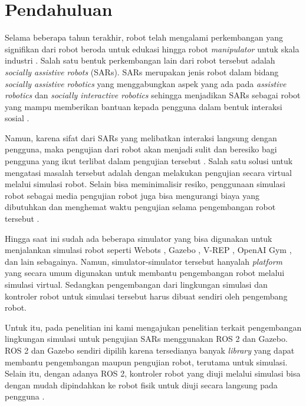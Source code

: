 \section{Pendahuluan}
\label{sec:pendahuluan}

Selama beberapa tahun terakhir, robot telah mengalami perkembangan yang signifikan dari robot beroda untuk edukasi \citep{goncalves2009} hingga robot \emph{manipulator} untuk skala industri \citep{Blatnicky2020}.
Salah satu bentuk perkembangan lain dari robot tersebut adalah \emph{socially assistive robots} (SARs).
SARs merupakan jenis robot dalam bidang \emph{socially assistive robotics} yang menggabungkan aspek yang ada pada \emph{assistive robotics} dan \emph{socially interactive robotics} sehingga menjadikan SARs sebagai robot yang mampu memberikan bantuan kepada pengguna dalam bentuk interaksi sosial \citep{seifer2005}.

Namun, karena sifat dari SARs yang melibatkan interaksi langsung dengan pengguna, maka pengujian dari robot akan menjadi sulit dan beresiko bagi pengguna yang ikut terlibat dalam pengujian tersebut \citep{erickson2020}.
Salah satu solusi untuk mengatasi masalah tersebut adalah dengan melakukan pengujian secara virtual melalui simulasi robot.
Selain bisa meminimalisir resiko, penggunaan simulasi robot sebagai media pengujian robot juga bisa mengurangi biaya yang dibutuhkan dan menghemat waktu pengujian selama pengembangan robot tersebut \citep{takaya2016}.

Hingga saat ini sudah ada beberapa simulator yang bisa digunakan untuk menjalankan simulasi robot seperti Webots \citep{michel2004}, Gazebo \citep{koenig2004}, V-REP \citep{rohmer2013}, OpenAI Gym \citep{brockman2016}, dan lain sebagainya.
Namun, simulator-simulator tersebut hanyalah \emph{platform} yang secara umum digunakan untuk membantu pengembangan robot melalui simulasi virtual.
Sedangkan pengembangan dari lingkungan simulasi dan kontroler robot untuk simulasi tersebut harus dibuat sendiri oleh pengembang robot.

Untuk itu, pada penelitian ini kami mengajukan penelitian terkait pengembangan lingkungan simulasi untuk pengujian SARs menggunakan ROS 2 dan Gazebo.
ROS 2 dan Gazebo sendiri dipilih karena tersedianya banyak \emph{library} yang dapat membantu pengembangan maupun pengujian robot, terutama untuk simulasi.
Selain itu, dengan adanya ROS 2, kontroler robot yang diuji melalui simulasi bisa dengan mudah dipindahkan ke robot fisik untuk diuji secara langsung pada pengguna \citep{takaya2016}.
